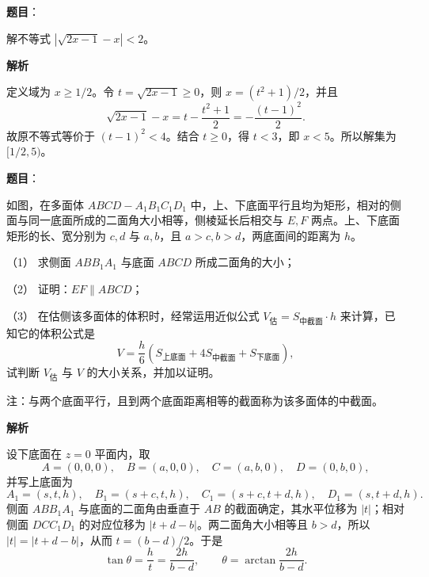 \begin{answer}

\textbf{题目}：

解不等式 \(\left|\sqrt{2x-1}-x\right|<2\)。

\textbf{解析}

定义域为 \(x\geqslant1/2\)。令 \(t=\sqrt{2x-1}\geqslant0\)，则 \(x=(t^2+1)/2\)，并且
\nopagebreak[4]
\[
\sqrt{2x-1}-x=t-\frac{t^2+1}{2}=-\frac{(t-1)^2}{2}.
\]
故原不等式等价于 \((t-1)^2<4\)。结合 \(t\geqslant0\)，得 \(t<3\)，即 \(x<5\)。所以解集为 \([1/2,5)\)。

\gkanswer{答案：\([\dfrac12,5)\)。}

\end{answer}
\begin{answer}

\textbf{题目}：

如图，在多面体 \(ABCD-A_1B_1C_1D_1\) 中，上、下底面平行且均为矩形，相对的侧面与同一底面所成的二面角大小相等，侧棱延长后相交与 \(E,F\) 两点。上、下底面矩形的长、宽分别为 \(c,d\) 与 \(a,b\)，且 \(a>c,b>d\)，两底面间的距离为 \(h\)。

（1） 求侧面 \(ABB_1A_1\) 与底面 \(ABCD\) 所成二面角的大小；

（2） 证明：\(EF\parallel ABCD\)；

（3） 在估侧该多面体的体积时，经常运用近似公式 \(V_{\text{估}}=S_{\text{中截面}}\cdot h\) 来计算，已知它的体积公式是
\nopagebreak[4]
\[
V=\frac{h}{6}\left(S_{\text{上底面}}+4S_{\text{中截面}}+S_{\text{下底面}}\right),
\]
试判断 \(V_{\text{估}}\) 与 \(V\) 的大小关系，并加以证明。

注：与两个底面平行，且到两个底面距离相等的截面称为该多面体的中截面。
\nopagebreak[4]
\begin{center}\end{center}
\nopagebreak[4]
\textbf{解析}


设下底面在 \(z=0\) 平面内，取
\nopagebreak[4]
\[
A=(0,0,0),\quad B=(a,0,0),\quad C=(a,b,0),\quad D=(0,b,0),
\]
并写上底面为
\nopagebreak[4]
\[
A_1=(s,t,h),\quad B_1=(s+c,t,h),\quad
C_1=(s+c,t+d,h),\quad D_1=(s,t+d,h).
\]
侧面 \(ABB_1A_1\) 与底面的二面角由垂直于 \(AB\) 的截面确定，其水平位移为 \(|t|\)；相对侧面 \(DCC_1D_1\) 的对应位移为 \(|t+d-b|\)。两二面角大小相等且 \(b>d\)，所以 \(|t|=|t+d-b|\)，从而 \(t=(b-d)/2\)。于是
\nopagebreak[4]
\[
\tan\theta=\frac{h}{t}=\frac{2h}{b-d},\qquad
\theta=\arctan\frac{2h}{b-d}.
\]


\end{answer}
